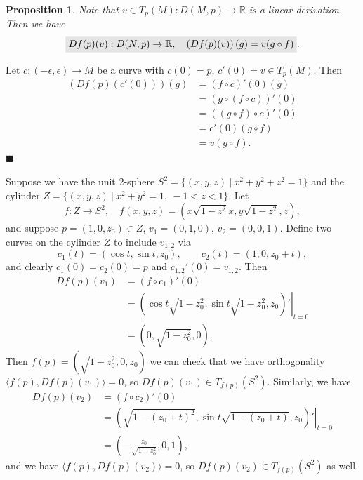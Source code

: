 \documentclass[letter-paper]{tufte-book}
\newtheorem{proposition}[theorem]{\color{pastel-blue}Proposition}
\newenvironment{proof}[1][Proof]{\begin{trivlist}
\item[\hskip \labelsep {\bfseries #1}]}{\end{trivlist}}
\newenvironment{example}[1][Example]{\begin{trivlist}
\item[\hskip \labelsep {\bfseries #1}]}{\end{trivlist}}
\newcommand{\qed}{\hfill$\blacksquare$}
\newcommand{\highlight}[1]{\mathchoice%
  {\colorbox{black!10}{$\displaystyle#1$}}%
  {\colorbox{black!10}{$\textstyle#1$}}%
  {\colorbox{black!10}{$\scriptstyle#1$}}%
  {\colorbox{black!10}{$\scriptscriptstyle#1$}}}%
\begin{document}
\begin{proposition}
  Note that $v \in T_p(M) : D(M,p) \to \mathbb{R}$ is a linear derivation. Then we have
\begin{equation}
  \highlight{Df(p)(v): D(N,p) \to \mathbb{R}, \quad \left(Df(p)(v)\right)(g) = v(g\circ f)}.
\end{equation}
\end{proposition}
\begin{proof}
  Let $c:(-\epsilon, \epsilon) \to M$ be a curve with $c(0) = p$, $c'(0) = v\in T_p(M)$. Then
  \begin{align*}
    \left(Df(p)(c'(0))\right)(g) &= (f\circ c)'(0)(g)\\
      &= (g\circ (f \circ c))'(0)\\
      &= ((g\circ f) \circ c)'(0)\\
      &= c'(0) (g\circ f)\\
      &= v(g\circ f).
  \end{align*}
  \qed
\end{proof}

\begin{example}
  Suppose we have the unit 2-sphere $S^2 = \{(x,y,z)\ |\ x^2 + y^2 + z^2 = 1\}$ and the cylinder $Z = \{(x,y,z)\ |\ x^2 + y^2 = 1,\ -1<z<1\}$. Let
  \begin{equation*}
    f: Z \to S^2, \quad f(x,y,z) = \left(x\sqrt{1-z^2}x, y\sqrt{1-z^2}, z\right),
  \end{equation*}
  and suppose $p = (1, 0, z_0) \in Z$, $v_1 = (0, 1, 0)$, $v_2 = (0, 0, 1)$. Define two curves on the cylinder $Z$ to include $v_{1,2}$ via
  \begin{equation*}
    c_1(t) = (\cos t, \sin t, z_0), \qquad c_2(t) = (1, 0, z_0 + t),
  \end{equation*}
  and clearly $c_1(0) = c_2(0) = p$ and $c_{1,2}'(0) = v_{1,2}$. Then
  \begin{align*}
    Df(p)(v_1) &= (f\circ c_1)'(0) \\
      &= \left.\left(\cos t\sqrt{1-z_0^2}, \sin t \sqrt{1-z_0^2}, z_0\right)'\right|_{t=0}\\
      &= \left(0, \sqrt{1-z_0^2}, 0\right).
  \end{align*}
  Then $f(p) = (\sqrt{1-z_0^2}, 0, z_0)$ we can check that we have orthogonality $\langle f(p), Df(p)(v_1)\rangle = 0$, so $Df(p)(v_1) \in T_{f(p)}(S^2)$. Similarly, we have
  \begin{align*}
    Df(p)(v_2) &= (f\circ c_2)'(0) \\
      &= \left.\left(\sqrt{1-(z_0+t)^2}, \sin t \sqrt{1-(z_0+t)}, z_0\right)'\right|_{t=0}\\
      &= \left(-\frac{z_0}{\sqrt{1-z_0^2}}, 0, 1\right),
  \end{align*}
  and we have $\langle f(p), Df(p)(v_2)\rangle = 0$, so $Df(p)(v_2) \in T_{f(p)}(S^2)$ as well.
\end{example}
\end{document}

